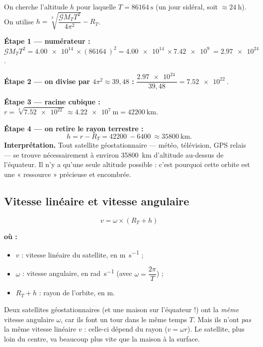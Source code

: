 \documentclass[11pt,a4paper]{article}
\newenvironment{ou}{%
  \par\smallskip\noindent\textbf{où :}\nopagebreak
  \begin{itemize}[leftmargin=1.8em,topsep=2pt,itemsep=1.5pt,parsep=0pt]}%
  {\end{itemize}}
\newcommand{\Grav}{\mathcal{G}}        %
\begin{document}
\begin{exemple}
On cherche l'altitude $h$ pour laquelle $T=\SI{86164}{\second}$ (un jour sidéral, soit
$\approx\SI{24}{\hour}$). On utilise $h=\sqrt[3]{\dfrac{\Grav M_T T^2}{4\pi^2}}-R_T$.

\smallskip
\textbf{Étape 1 --- numérateur :}
$\Grav M_T T^2=\SI{4.00e14}{}\times(\SI{86164}{})^2
=\SI{4.00e14}{}\times\SI{7.42e9}{}=\SI{2.97e24}{}$.

\textbf{Étape 2 --- on divise par $4\pi^2\approx 39{,}48$ :}
$\dfrac{\SI{2.97e24}{}}{39{,}48}=\SI{7.52e22}{}$.

\textbf{Étape 3 --- racine cubique :}
$r=\sqrt[3]{\SI{7.52e22}{}}\approx\SI{4.22e7}{\metre}=\SI{42200}{\kilo\metre}$.

\textbf{Étape 4 --- on retire le rayon terrestre :}
\[
h=r-R_T=\SI{42200}{}-\SI{6400}{}\approx\SI{35800}{\kilo\metre}.
\]
\textbf{Interprétation.} Tout satellite géostationnaire — météo, télévision, GPS relais —
se trouve nécessairement à environ \SI{35800}{\kilo\metre} d'altitude au-dessus de
l'équateur. Il n'y a qu'une seule altitude possible : c'est pourquoi cette orbite est
une « ressource » précieuse et encombrée.
\end{exemple}

\subsection{Vitesse linéaire et vitesse angulaire}

\begin{formule}
\[
\boxed{\;v=\omega\times(R_T+h)\;}
\]
\begin{ou}
  \item $v$ : vitesse linéaire du satellite, en \si{\metre\per\second} ;
  \item $\omega$ : vitesse angulaire, en \si{\radian\per\second}
        (avec $\omega=\dfrac{2\pi}{T}$) ;
  \item $R_T+h$ : rayon de l'orbite, en \si{\metre}.
\end{ou}
\end{formule}

\begin{attention}
Deux satellites géostationnaires (et une maison sur l'équateur !) ont la \emph{même}
vitesse angulaire $\omega$, car ils font un tour dans le même temps $T$. Mais ils n'ont
\emph{pas} la même vitesse linéaire $v$ : celle-ci dépend du rayon ($v=\omega r$). Le
satellite, plus loin du centre, va beaucoup plus vite que la maison à la surface.
\end{attention}
\end{document}
